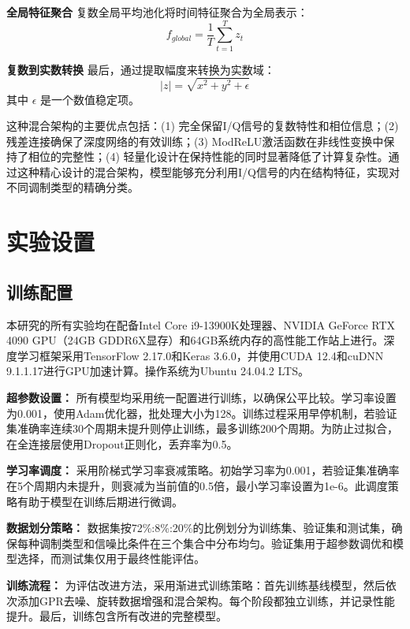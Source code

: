 \documentclass[conference]{IEEEtran}
\begin{document}
\textbf{全局特征聚合} 复数全局平均池化将时间特征聚合为全局表示：
\begin{equation}
f_{global} = \frac{1}{T} \sum_{t=1}^T z_t
\end{equation}

\textbf{复数到实数转换} 最后，通过提取幅度来转换为实数域：
\begin{equation}
|z| = \sqrt{x^2 + y^2 + \epsilon}
\end{equation}
其中 $\epsilon$ 是一个数值稳定项。

这种混合架构的主要优点包括：(1) 完全保留I/Q信号的复数特性和相位信息；(2) 残差连接确保了深度网络的有效训练；(3) ModReLU激活函数在非线性变换中保持了相位的完整性；(4) 轻量化设计在保持性能的同时显著降低了计算复杂性。通过这种精心设计的混合架构，模型能够充分利用I/Q信号的内在结构特征，实现对不同调制类型的精确分类。


\section{实验设置}

\subsection{训练配置}

本研究的所有实验均在配备Intel Core i9-13900K处理器、NVIDIA GeForce RTX 4090 GPU（24GB GDDR6X显存）和64GB系统内存的高性能工作站上进行。深度学习框架采用TensorFlow 2.17.0和Keras 3.6.0，并使用CUDA 12.4和cuDNN 9.1.1.17进行GPU加速计算。操作系统为Ubuntu 24.04.2 LTS。

\textbf{超参数设置：}
所有模型均采用统一配置进行训练，以确保公平比较。学习率设置为0.001，使用Adam优化器，批处理大小为128。训练过程采用早停机制，若验证集准确率连续30个周期未提升则停止训练，最多训练200个周期。为防止过拟合，在全连接层使用Dropout正则化，丢弃率为0.5。

\textbf{学习率调度：}
采用阶梯式学习率衰减策略。初始学习率为0.001，若验证集准确率在5个周期内未提升，则衰减为当前值的0.5倍，最小学习率设置为1e-6。此调度策略有助于模型在训练后期进行微调。

\textbf{数据划分策略：}
数据集按72\%:8\%:20\%的比例划分为训练集、验证集和测试集，确保每种调制类型和信噪比条件在三个集合中分布均匀。验证集用于超参数调优和模型选择，而测试集仅用于最终性能评估。

\textbf{训练流程：}
为评估改进方法，采用渐进式训练策略：首先训练基线模型，然后依次添加GPR去噪、旋转数据增强和混合架构。每个阶段都独立训练，并记录性能提升。最后，训练包含所有改进的完整模型。
\end{document}
